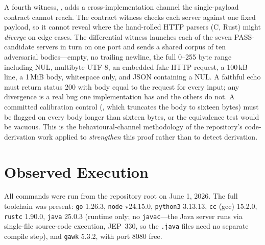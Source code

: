 \documentclass[11pt,letterpaper]{article}
\begin{document}
A fourth witness, , adds a
cross-implementation channel the single-payload contract cannot reach.
The contract witness checks each server against one fixed payload, so it
cannot reveal where the hand-rolled HTTP parsers (C, Rust) might
\emph{diverge} on edge cases. The differential witness launches each of
the seven PASS-candidate servers in turn on one port and sends a shared
corpus of ten adversarial bodies---empty, no trailing newline, the full
0--255 byte range including NUL, multibyte UTF-8, an embedded fake HTTP
request, a 100\,kB line, a 1\,MiB body, whitespace only, and JSON
containing a NUL. A faithful echo must return status 200 with body equal
to the request for every input; any divergence is a real bug one
implementation has and the others do not. A committed calibration
control (, which truncates the body to
sixteen bytes) must be flagged on every body longer than sixteen bytes,
or the equivalence test would be vacuous. This is the behavioural-channel
methodology of the repository's code-derivation work applied to
\emph{strengthen} this proof rather than to detect derivation.

\section{Observed Execution}
\label{sec:observed}

All commands were run from the repository root on June 1, 2026. The full
toolchain was present: \texttt{go} 1.26.3, \texttt{node} v24.15.0,
\texttt{python3} 3.13.13, \texttt{cc} (gcc) 15.2.0, \texttt{rustc}
1.90.0, \texttt{java} 25.0.3 (runtime only; no \texttt{javac}---the Java
server runs via single-file source-code execution, JEP~330, so the
\texttt{.java} files need no separate compile step), and \texttt{gawk}
5.3.2, with port 8080 free.
\end{document}
